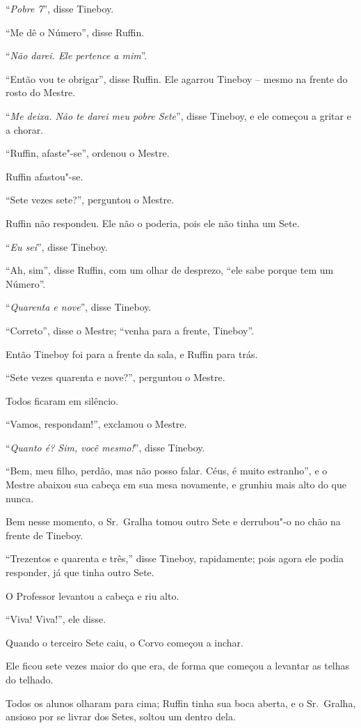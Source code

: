 ``\emph{Pobre 7}'', disse Tineboy.

``Me dê o Número'', disse Ruffin.

``\emph{Não darei. Ele pertence a mim}''.

``Então vou te obrigar'', disse Ruffin. Ele agarrou Tineboy -- mesmo na
frente do rosto do Mestre.

``\emph{Me deixa. Não te darei meu pobre Sete}'', disse Tineboy, e ele
começou a gritar e a chorar.

``Ruffin, afaste"-se'', ordenou o Mestre.

Ruffin afastou"-se.

``Sete vezes sete?'', perguntou o Mestre.

Ruffin não respondeu. Ele não o poderia, pois ele não tinha um Sete.

``\emph{Eu sei}'', disse Tineboy.

``Ah, sim'', disse Ruffin, com um olhar de desprezo, ``ele sabe porque
tem um Número''.

``\emph{Quarenta e nove}'', disse Tineboy.

``Correto'', disse o Mestre; ``venha para a frente, Tineboy''.

Então Tineboy foi para a frente da sala, e Ruffin para trás.

``Sete vezes quarenta e nove?'', perguntou o Mestre.

Todos ficaram em silêncio.

``Vamos, respondam!'', exclamou o Mestre.

``\emph{Quanto é? Sim, você mesmo!}'', disse Tineboy.

``Bem, meu filho, perdão, mas não posso falar. Céus, é muito estranho'',
e o Mestre abaixou sua cabeça em sua mesa novamente, e grunhiu mais alto
do que nunca.

Bem nesse momento, o Sr.~Gralha tomou outro Sete e derrubou"-o no chão na
frente de Tineboy.

``Trezentos e quarenta e três,'' disse Tineboy, rapidamente; pois agora
ele podia responder, já que tinha outro Sete.

O Professor levantou a cabeça e riu alto.

``Viva! Viva!'', ele disse.

Quando o terceiro Sete caiu, o Corvo começou a inchar.

Ele ficou sete vezes maior do que era, de forma que começou a levantar
as telhas do telhado.

Todos os alunos olharam para cima; Ruffin tinha sua boca aberta, e o Sr.~Gralha, ansioso por se livrar dos Setes, soltou um dentro dela.

